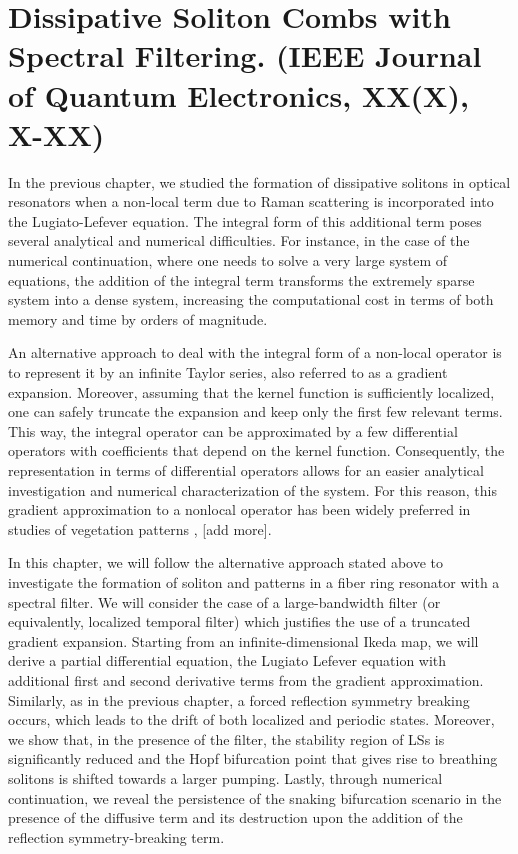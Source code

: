 \chapter{Dissipative Soliton Combs with Spectral Filtering. (IEEE Journal of Quantum Electronics, XX(X), X-XX)}

In the previous chapter, we studied the formation of dissipative solitons in optical
resonators when a non-local
term due to Raman scattering is incorporated into the Lugiato-Lefever equation. The
integral form of this additional term poses several analytical and numerical difficulties.
For instance, in the case of the numerical continuation, where one needs to solve a very
large system of equations, the addition of the integral term transforms the extremely sparse
system into a dense system, increasing the computational cost in terms of both memory and time
by orders of magnitude.

An alternative approach to deal with the integral form of a non-local operator is to represent
it by an infinite Taylor series, also referred to as a gradient expansion. Moreover, 
assuming that the kernel function is sufficiently localized, one can safely truncate the expansion
and keep only the first few relevant terms. This way, the integral operator can be
approximated by a few differential operators with coefficients that depend on
the kernel function. Consequently, the representation in terms of differential operators
allows for an easier analytical investigation and numerical characterization of the system.
For this reason, this gradient approximation to a nonlocal operator has been widely 
preferred in studies of vegetation patterns \cite{lefever1997origin}, [add more].

In this chapter, we will follow the alternative approach stated above to investigate
the formation of soliton and patterns in a fiber ring resonator with a spectral filter. 
We will consider the case of a large-bandwidth filter (or equivalently, localized temporal filter)
which justifies the use of a truncated gradient expansion. Starting from an infinite-dimensional
Ikeda map, we will derive a partial differential equation, the Lugiato Lefever equation with additional
first and second derivative terms from the gradient approximation. Similarly, as in the previous chapter,
a forced reflection symmetry breaking occurs, which leads to the drift of both localized and periodic states.
Moreover, we show that, in the presence of the filter, the stability region of LSs is significantly reduced
and the Hopf bifurcation point that gives rise to breathing solitons is shifted towards a larger pumping.
Lastly, through numerical continuation, we reveal the persistence of the snaking bifurcation scenario in
the presence of the diffusive term and its destruction upon the addition of the reflection symmetry-breaking term.

